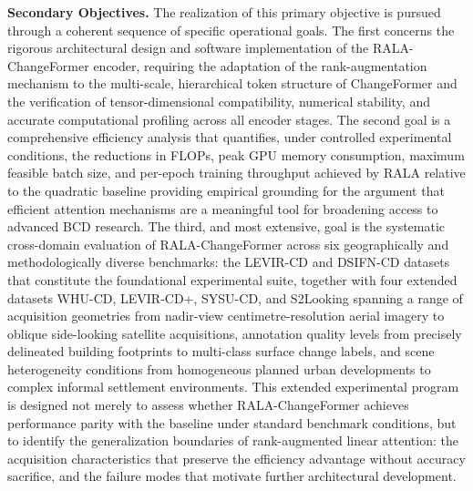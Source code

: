 \noindent\textbf{Secondary Objectives.} The realization of this primary objective is pursued through a coherent sequence of specific operational goals. The first concerns the rigorous architectural design and software implementation of the RALA-ChangeFormer encoder, requiring the adaptation of the rank-augmentation mechanism to the multi-scale, hierarchical token structure of ChangeFormer \cite{Bandara2022ChangeFormer} and the verification of tensor-dimensional compatibility, numerical stability, and accurate computational profiling across all encoder stages. The second goal is a comprehensive efficiency analysis that quantifies, under controlled experimental conditions, the reductions in \ac{FLOPs}, peak \ac{GPU} memory consumption, maximum feasible batch size, and per-epoch training throughput achieved by \ac{RALA} relative to the quadratic baseline providing empirical grounding for the argument that efficient attention mechanisms are a meaningful tool for broadening access to advanced \ac{BCD} research. The third, and most extensive, goal is the systematic cross-domain evaluation of RALA-ChangeFormer across six geographically and methodologically diverse benchmarks: the LEVIR-CD and DSIFN-CD datasets that constitute the foundational experimental suite, together with four extended datasets WHU-CD, LEVIR-CD+, SYSU-CD, and S2Looking  spanning a range of acquisition geometries from nadir-view centimetre-resolution aerial imagery to oblique side-looking satellite acquisitions, annotation quality levels from precisely delineated building footprints to multi-class surface change labels, and scene heterogeneity conditions from homogeneous planned urban developments to complex informal settlement environments. This extended experimental program is designed not merely to assess whether RALA-ChangeFormer achieves performance parity with the baseline under standard benchmark conditions, but to identify the generalization boundaries of rank-augmented linear attention: the acquisition characteristics that preserve the efficiency advantage without accuracy sacrifice, and the failure modes that motivate further architectural development.

